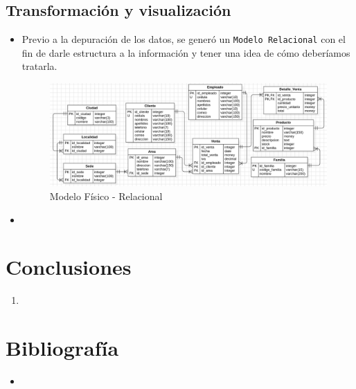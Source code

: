 \documentclass[12pt]{article}
\begin{document}
        \newpage    
        \subsection{Transformación y visualización}
            \begin{itemize}
                \item Previo a la depuración de los datos, se generó un \texttt{Modelo Relacional} con el fin de darle estructura a la información y tener una idea de cómo deberíamos tratarla.
                    \begin{figure}[h]
                        \centering 
                        \includegraphics[width=1\textwidth]{img/transformacion-1.png}
                        \caption{Modelo Físico - Relacional}
                    \end{figure}
                
                \item 
            \end{itemize}


        \subsection{}


    \newpage
    \section{Conclusiones}
        \begin{enumerate}
            \item 
        \end{enumerate}


    \section{Bibliografía}
        \begin{itemize}
            \item 
        \end{itemize}
\end{document}
